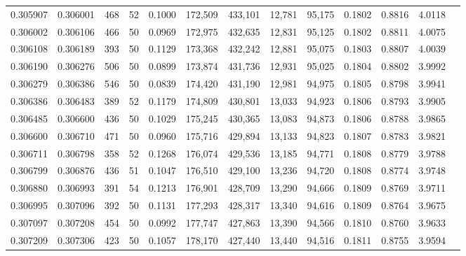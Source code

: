 \begin{tabular}{rrrrrrrrrrrrr}
0.305907 & 0.306001 &   468 &  52 &                                     0.1000 & 172,509 & 433,101 &  12,781 &  95,175 & 0.1802 & 0.8816 & 4.0118 \\
0.306002 & 0.306106 &   466 &  50 &                                     0.0969 & 172,975 & 432,635 &  12,831 &  95,125 & 0.1802 & 0.8811 & 4.0075 \\
0.306108 & 0.306189 &   393 &  50 &                                     0.1129 & 173,368 & 432,242 &  12,881 &  95,075 & 0.1803 & 0.8807 & 4.0039 \\
0.306190 & 0.306276 &   506 &  50 &                                     0.0899 & 173,874 & 431,736 &  12,931 &  95,025 & 0.1804 & 0.8802 & 3.9992 \\
0.306279 & 0.306386 &   546 &  50 &                                     0.0839 & 174,420 & 431,190 &  12,981 &  94,975 & 0.1805 & 0.8798 & 3.9941 \\
0.306386 & 0.306483 &   389 &  52 &                                     0.1179 & 174,809 & 430,801 &  13,033 &  94,923 & 0.1806 & 0.8793 & 3.9905 \\
0.306485 & 0.306600 &   436 &  50 &                                     0.1029 & 175,245 & 430,365 &  13,083 &  94,873 & 0.1806 & 0.8788 & 3.9865 \\
0.306600 & 0.306710 &   471 &  50 &                                     0.0960 & 175,716 & 429,894 &  13,133 &  94,823 & 0.1807 & 0.8783 & 3.9821 \\
0.306711 & 0.306798 &   358 &  52 &                                     0.1268 & 176,074 & 429,536 &  13,185 &  94,771 & 0.1808 & 0.8779 & 3.9788 \\
0.306799 & 0.306876 &   436 &  51 &                                     0.1047 & 176,510 & 429,100 &  13,236 &  94,720 & 0.1808 & 0.8774 & 3.9748 \\
0.306880 & 0.306993 &   391 &  54 &                                     0.1213 & 176,901 & 428,709 &  13,290 &  94,666 & 0.1809 & 0.8769 & 3.9711 \\
0.306995 & 0.307096 &   392 &  50 &                                     0.1131 & 177,293 & 428,317 &  13,340 &  94,616 & 0.1809 & 0.8764 & 3.9675 \\
0.307097 & 0.307208 &   454 &  50 &                                     0.0992 & 177,747 & 427,863 &  13,390 &  94,566 & 0.1810 & 0.8760 & 3.9633 \\
0.307209 & 0.307306 &   423 &  50 &                                     0.1057 & 178,170 & 427,440 &  13,440 &  94,516 & 0.1811 & 0.8755 & 3.9594 \\

\end{tabular}
